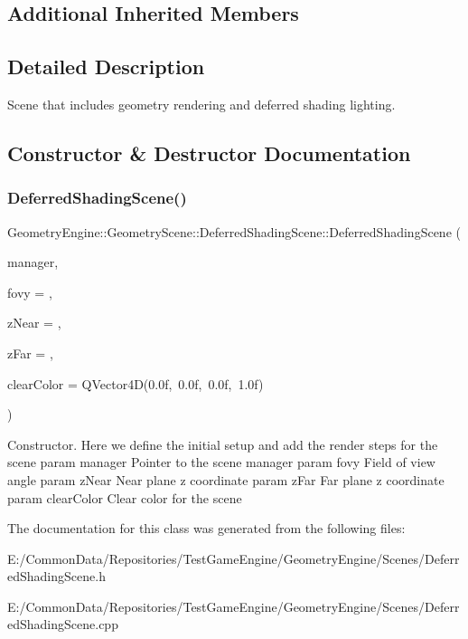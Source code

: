 \subsection*{Additional Inherited Members}


\subsection{Detailed Description}
Scene that includes geometry rendering and deferred shading lighting. 

\subsection{Constructor \& Destructor Documentation}
\mbox{\label{class_geometry_engine_1_1_geometry_scene_1_1_deferred_shading_scene_a333dbad12685941c5764f88c37263cac}} 
\subsubsection{\texorpdfstring{DeferredShadingScene()}{DeferredShadingScene()}}
{\footnotesize\ttfamily Geometry\+Engine\+::\+Geometry\+Scene\+::\+Deferred\+Shading\+Scene\+::\+Deferred\+Shading\+Scene (\begin{DoxyParamCaption}\item[{\mbox{\hyperlink{class_geometry_engine_1_1_scene_manager}{Scene\+Manager}} $\ast$}]{manager,  }\item[{G\+Ldouble}]{fovy = {},  }\item[{G\+Ldouble}]{z\+Near = {},  }\item[{G\+Ldouble}]{z\+Far = {},  }\item[{Q\+Vector4D}]{clear\+Color = {\ttfamily QVector4D(0.0f,~0.0f,~0.0f,~1.0f)} }\end{DoxyParamCaption})}

Constructor. Here we define the initial setup and add the render steps for the scene param manager Pointer to the scene manager param fovy Field of view angle param z\+Near Near plane z coordinate param z\+Far Far plane z coordinate param clear\+Color Clear color for the scene 

The documentation for this class was generated from the following files\+:\begin{DoxyCompactItemize}
\item 
E\+:/\+Common\+Data/\+Repositories/\+Test\+Game\+Engine/\+Geometry\+Engine/\+Scenes/Deferred\+Shading\+Scene.\+h\item 
E\+:/\+Common\+Data/\+Repositories/\+Test\+Game\+Engine/\+Geometry\+Engine/\+Scenes/Deferred\+Shading\+Scene.\+cpp\end{DoxyCompactItemize}
